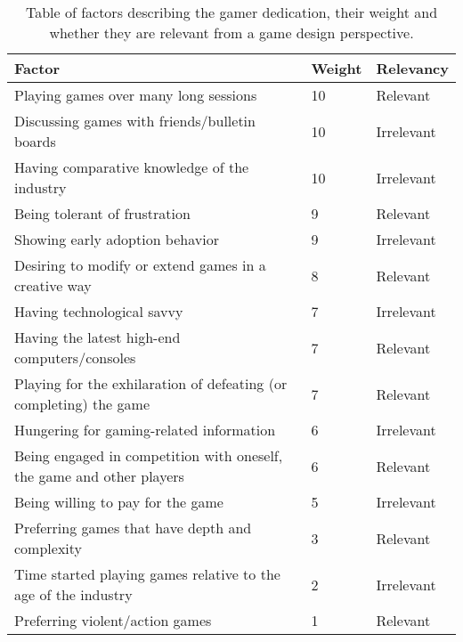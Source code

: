 \begin{table}[H]
\begin{tabular}{|l|l|l|}
\hline
\rowcolor[HTML]{C0C0C0} 
Factor                                                                & Weight 	& Relevancy \\ \hline
Playing games over many long sessions                                 & 10     	& Relevant 	\\ \hline
Discussing games with friends/bulletin boards                         & 10     	& Irrelevant\\ \hline
Having comparative knowledge of the industry                          & 10      & Irrelevant\\ \hline
Being tolerant of frustration                                         & 9       & Relevant 	\\ \hline
Showing early adoption behavior                                       & 9       & Irrelevant\\ \hline
Desiring to modify or extend games in a creative way                  & 8       & Relevant  \\ \hline
Having technological savvy                                            & 7       & Irrelevant\\ \hline
Having the latest high-end computers/consoles                         & 7       & Relevant  \\ \hline
Playing for the exhilaration of defeating (or completing) the game    & 7       & Relevant  \\ \hline
Hungering for gaming-related information                              & 6       & Irrelevant\\ \hline
Being engaged in competition with oneself, the game and other players & 6       & Relevant  \\ \hline
Being willing to pay for the game                                     & 5       & Irrelevant\\ \hline
Preferring games that have depth and complexity                       & 3       & Relevant  \\ \hline
Time started playing games relative to the age of the industry        & 2       & Irrelevant\\ \hline
Preferring violent/action games                                       & 1       & Relevant  \\ \hline
\end{tabular}
\caption{Table of factors describing the gamer dedication, their weight and whether they are relevant from a game design perspective.}
\label{tab:gamerdedication}
\end{table}

